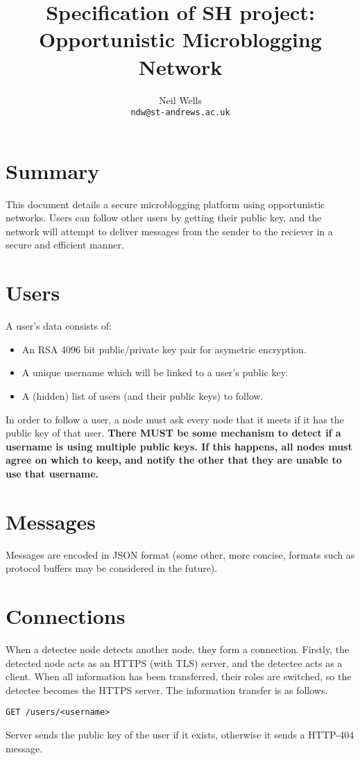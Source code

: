 \documentclass{article}
\title{\textbf{Specification of SH project: Opportunistic Microblogging Network}}
\author{Neil Wells\\
\texttt{ndw@st-andrews.ac.uk}}
\date{}
\begin{document}
\maketitle

\section*{Summary}
This document details a secure microblogging platform using opportunistic networks. Users can follow other users by getting their public key, and the network will attempt to deliver messages from the sender to the reciever in a secure and efficient manner.

\section*{Users}
A user's data consists of:
\begin{itemize}
\item An RSA 4096 bit public/private key pair for asymetric encryption.
\item A unique username which will be linked to a user's public key.
\item A (hidden) list of users (and their public keys) to follow.
\end{itemize}
In order to follow a user, a node must ask every node that it meets if it has the public key of that user. \textbf{There MUST be some mechanism to detect if a username is using multiple public keys. If this happens, all nodes must agree on which to keep, and notify the other that they are unable to use that username.}

\section*{Messages}
Messages are encoded in JSON format (some other, more concise, formats such as protocol buffers may be considered in the future).


\section*{Connections}
When a detectee node detects another node, they form a connection. Firstly, the detected node acts as an HTTPS (with TLS) server, and the detectee acts as a client. When all information has been transferred, their roles are switched, so the detectee becomes the HTTPS server. The information transfer is as follows.

\begin{verbatim}
GET /users/<username>
\end{verbatim}
Server sends the public key of the user if it exists, otherwise it sends a HTTP-404 message.
\end{document}
